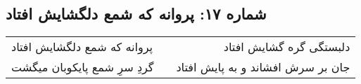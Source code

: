 \begin{center}
\section*{شماره ۱۷: پروانه که شمع دلگشایش افتاد}
\label{sec:017}
\begin{longtable}{l p{0.5cm} r}
پروانه که شمع دلگشایش افتاد
&&
دلبستگی گره گشایش افتاد
\\
گردِ سرِ شمع پایکوبان میگشت
&&
جان بر سرش افشاند و به پایش افتاد
\\
\end{longtable}
\end{center}
